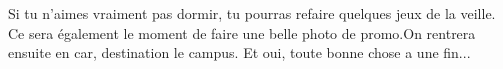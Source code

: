 Si tu n'aimes vraiment pas dormir, tu pourras refaire quelques
jeux de la veille. Ce sera également le moment
de faire une belle photo de promo.On rentrera ensuite en
car, destination le campus. Et oui, toute bonne chose a une fin...
